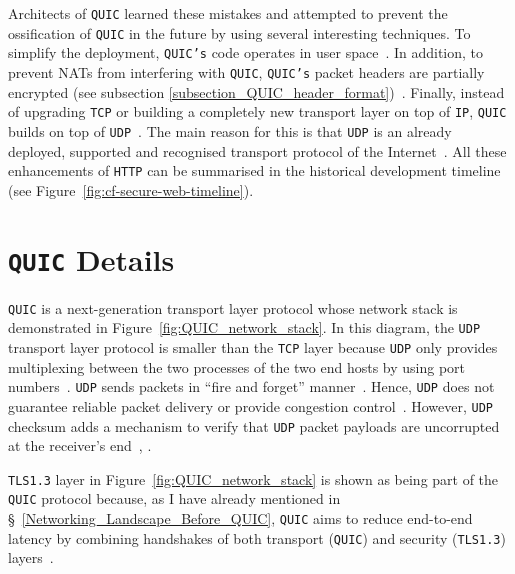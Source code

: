 \documentclass[12pt,a4paper]{report}
\begin{document}
Architects of \texttt{QUIC} learned these mistakes and attempted to prevent the ossification of \texttt{QUIC} in the future by using several interesting techniques.
To simplify the deployment, \texttt{QUIC's} code operates in user space~\cite{quic-and-http-3-too-big-to-fail}.
In addition, to prevent NATs from interfering with \texttt{QUIC}, \texttt{QUIC's} packet headers are partially encrypted (see subsection \ref{subsection_QUIC_header_format})~\cite{bib_Netdev_0x13_QUIC_Tutorial}.
Finally, instead of upgrading \texttt{TCP} or building a completely new transport layer on top of \texttt{IP}, \texttt{QUIC} builds on top of \texttt{UDP}~\cite{chromium_blog_about_quic}.
The main reason for this is that \texttt{UDP} is an already deployed, supported and recognised transport protocol of the Internet~\cite{the-road-to-quic}.
All these enhancements of \texttt{HTTP} can be summarised in the historical development timeline (see Figure~\ref{fig:cf-secure-web-timeline}).




\section{\texttt{QUIC} Details} \label{QUIC_details_section}

\texttt{QUIC} is a next-generation transport layer protocol whose network stack is demonstrated in Figure~\ref{fig:QUIC_network_stack}. In this diagram, the \texttt{UDP} transport layer protocol is smaller than the \texttt{TCP} layer because \texttt{UDP} only provides multiplexing between the two processes of the two end hosts by using port numbers~\cite[Chapter 5.1]{PetersonLarryL2007CNAS}.
\texttt{UDP} sends packets in \enquote{fire and forget} manner~\cite{Google_QUIC_protocol_moving_the_web_from_TCP_to_UDP}.
Hence, \texttt{UDP} does not guarantee reliable packet delivery or provide congestion control~\cite[Chapter 5.1]{PetersonLarryL2007CNAS}.
However, \texttt{UDP} checksum adds a mechanism to verify that \texttt{UDP} packet payloads are uncorrupted at the receiver's end~\cite[Chapter 5.1]{PetersonLarryL2007CNAS}, \cite{how-is-tcp-and-udp-checksum-calculated, udp-user-datagram-protocol}.

\texttt{TLS1.3} layer in Figure~\ref{fig:QUIC_network_stack} is shown as being part of the \texttt{QUIC} protocol because, as I have already mentioned in \S~\ref{Networking_Landscape_Before_QUIC},  \texttt{QUIC} aims to reduce end-to-end latency by combining handshakes of both transport (\texttt{QUIC}) and security (\texttt{TLS1.3}) layers~\cite{Google_QUIC_protocol_moving_the_web_from_TCP_to_UDP, HTTP_3_the_past_the_present_and_the_future}.
\end{document}

